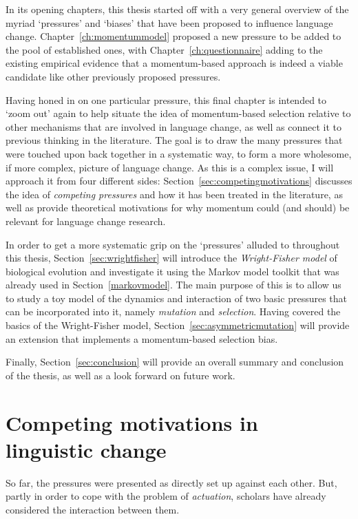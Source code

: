 In its opening chapters, this thesis started off with a very general overview of the myriad `pressures' and `biases' that have been proposed to influence language change. Chapter~\ref{ch:momentummodel} proposed a new pressure to be added to the pool of established ones, with Chapter~\ref{ch:questionnaire} adding to the existing empirical evidence that a momentum-based approach is indeed a viable candidate like other previously proposed pressures.

Having honed in on one particular pressure, this final chapter is intended to `zoom out' again to help situate the idea of momentum-based selection relative to other mechanisms that are involved in language change, as well as connect it to previous thinking in the literature. %
The goal is to draw the many pressures that were touched upon back together in a systematic way, to form a more wholesome, if more complex, picture of language change. As this is a complex issue, I will approach it from four different sides: Section~\ref{sec:competingmotivations} discusses the idea of \emph{competing pressures} and how it has been treated in the literature, as well as provide theoretical motivations for why momentum could (and should) be relevant for language change research. %

In order to get a more systematic grip on the `pressures' alluded to throughout this thesis, Section~\ref{sec:wrightfisher} will introduce the \emph{Wright-Fisher model} of biological evolution and investigate it using the Markov model toolkit that was already used in Section~\ref{markovmodel}. The main purpose of this is to allow us to study a toy model of the dynamics and interaction of two basic pressures that can be incorporated into it, namely \emph{mutation} and \emph{selection}. Having covered the basics of the Wright-Fisher model, Section~\ref{sec:asymmetricmutation} will provide an extension that implements a momentum-based selection bias.

Finally, Section~\ref{sec:conclusion} will provide an overall summary and conclusion of the thesis, as well as a look forward on future work.


\section{Competing motivations in linguistic change}
\label{sec:competingmotivations}
So far, the pressures were presented as directly set up against each other. But, partly in order to cope with the problem of \emph{actuation},  scholars have already considered the interaction between them.

